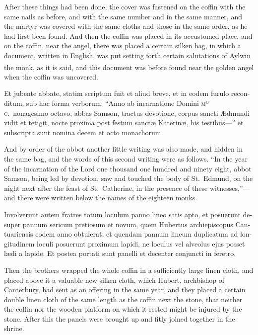\documentclass{book}
\newcounter{engnote}
\newcommand{\engnotenum}{\textsuperscript{\arabic{engnote}\stepcounter{engnote}}}
\begin{document}
\begin{paracol}{2}
\switchcolumn

After these things had been done, the cover was fastened on the coffin with the same nails as before, and with the same number and in the same manner, and the martyr was covered with the same cloths and those in the same order, as he had first been found. And then the coffin was placed in its accustomed place, and on the coffin, near the angel, there was placed a certain silken bag, in which a document, written in English, was put setting forth certain salutations of Aylwin the monk,\engnotenum{} as it is said, and this document was before found near the golden angel when the coffin was uncovered.

\switchcolumn*

\begin{otherlanguage}{latin}
Et jubente abbate, statim scriptum fuit et aliud breve, et in eodem furulo reconditum, sub hac forma verborum: ``Anno ab incarnatione Domini \textsc{mº c}.\ nonagesimo octavo, abbas Samson, tractus devotione, corpus sancti \AE{}dmundi vidit et tetigit, nocte proxima post festum sanct\ae{} Katerin\ae{}, his testibus---'' et subscripta sunt nomina decem et octo monachorum. 
\end{otherlanguage}

\switchcolumn

And by order of the abbot another little writing was also made, and hidden in the same bag, and the words of this second writing were as follows. ``In the year of the incarnation of the Lord one thousand one hundred and ninety eight, abbot Samson, being led by devotion, saw and touched the body of St.\ Edmund, on the night next after the feast of St.\ Catherine, in the presence of these witnesses,''---and there were written below the names of the eighteen monks.

\switchcolumn*

\begin{otherlanguage}{latin}
Involverunt autem fratres totum loculum panno lineo satis apto, et posuerunt desuper pannum sericum pretiosum et novum, quem Hubertus archiepiscopus Cantuariensis eodem anno obtulerat, et quendam pannum lineum duplicatum ad longitudinem loculi posuerunt proximum lapidi, ne loculus vel alveolus ejus posset l\ae{}di a lapide. Et postea portati sunt panelli et decenter conjuncti in feretro. 
\end{otherlanguage}

\switchcolumn

Then the brothers wrapped the whole coffin in a sufficiently large linen cloth, and placed above it a valuable new silken cloth, which Hubert, archbishop of Canterbury, had sent as an offering in the same year, and they placed a certain double linen cloth of the same length as the coffin next the stone, that neither the coffin nor the wooden platform on which it rested might be injured by the stone. After this the panels were brought up and fitly joined together in the shrine.


\end{paracol}
\end{document}
